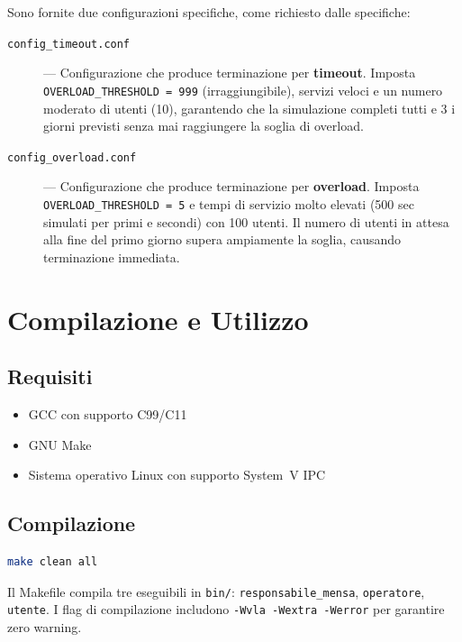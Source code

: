 \documentclass[a4paper,12pt]{article}
\begin{document}
Sono fornite due configurazioni specifiche, come richiesto dalle specifiche:

\begin{description}
  \item[\texttt{config\_timeout.conf}] --- Configurazione che produce
    terminazione per \textbf{timeout}. Imposta
    \texttt{OVERLOAD\_THRESHOLD = 999} (irraggiungibile), servizi
    veloci e un numero moderato di utenti (10), garantendo che la
    simulazione completi tutti e 3 i giorni previsti senza mai
    raggiungere la soglia di overload.

  \item[\texttt{config\_overload.conf}] --- Configurazione che produce
    terminazione per \textbf{overload}. Imposta
    \texttt{OVERLOAD\_THRESHOLD = 5} e tempi di servizio molto elevati
    (500 sec simulati per primi e secondi) con 100 utenti. Il numero
    di utenti in attesa alla fine del primo giorno supera ampiamente la
    soglia, causando terminazione immediata.
\end{description}

\section{Compilazione e Utilizzo}

\subsection{Requisiti}

\begin{itemize}
  \item GCC con supporto C99/C11
  \item GNU Make
  \item Sistema operativo Linux con supporto System~V IPC
\end{itemize}

\subsection{Compilazione}

\begin{lstlisting}[language=bash, caption={Compilazione del progetto.}]
make clean all
\end{lstlisting}

Il Makefile compila tre eseguibili in \texttt{bin/}:
\texttt{responsabile\_mensa}, \texttt{operatore}, \texttt{utente}.
I flag di compilazione includono \texttt{-Wvla -Wextra -Werror}
per garantire zero warning.
\end{document}
